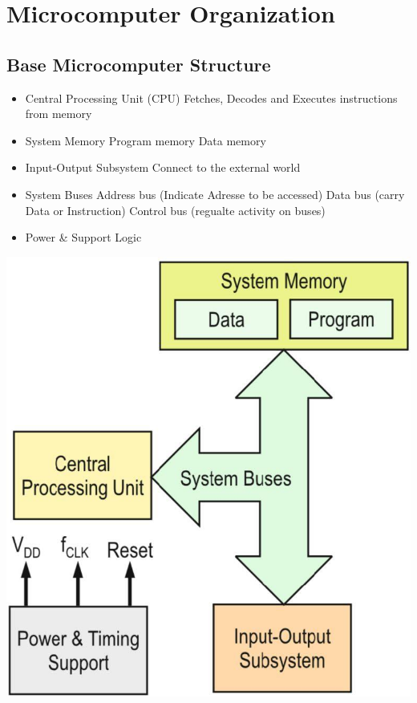 \section{Microcomputer Organization } 
\subsection{Base Microcomputer Structure }
\begin{minipage}{0.7\linewidth}
	\begin{itemize}
		\item Central Processing Unit (\acs{CPU})
		\subitem Fetches, Decodes and Executes instructions from memory
		\item System Memory
		\subitem Program memory
		\subitem Data memory 
		\item Input-Output Subsystem
		\subitem Connect to the external world
		\item System Buses 
		\subitem Address bus (Indicate Adresse to be accessed)
		\subitem Data bus (carry Data or Instruction)
		\subitem Control bus (regualte activity on buses)
		\item Power \& Support Logic
	\end{itemize}
\end{minipage}
\begin{minipage}{0.3\linewidth}
	\includegraphics[width=0.8\linewidth]{images/uCArchitecture} 
\end{minipage}
